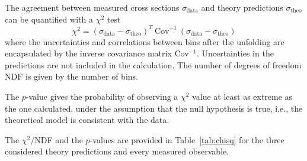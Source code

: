 The agreement between measured cross sections $\sigma_\text{data}$ and theory predictions $\sigma_\text{theo}$ can be quantified with a $\chi^2$ test
\begin{equation}
    \chi^2 = (\sigma_\text{data}-\sigma_\text{theo})^T~\text{Cov}^{-1}~(\sigma_\text{data}-\sigma_\text{theo})
\end{equation}
where the uncertainties and correlations between bins after the unfolding are encapsulated by the inverse covariance matrix Cov$^{-1}$.
Uncertainties in the predictions are not included in the calculation.
The number of degrees of freedom NDF is given by the number of bins.

The $p$-value gives the probability of observing a
$\chi^2$ value at least as extreme as the one calculated, under the assumption that the null hypothesis is true, i.e., the theoretical model is consistent with the data.

The $\chi^2/$NDF and the $p$-values are provided in Table~\ref{tab:chisq} for the three considered theory predictions and every measured observable.

